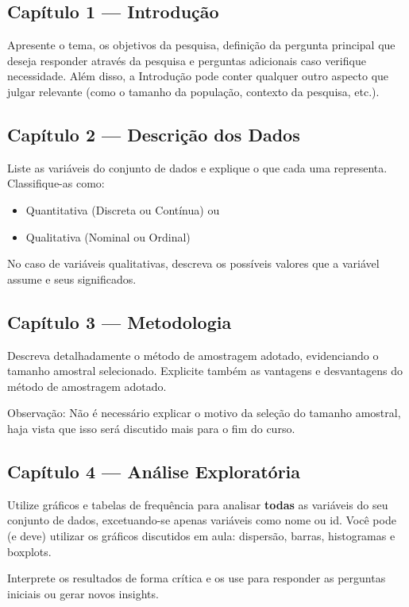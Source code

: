 \documentclass[12pt]{article}
\begin{document}
\subsection*{Capítulo 1 — Introdução}
Apresente o tema, os objetivos da pesquisa, definição da pergunta principal que deseja responder através da pesquisa e 
perguntas adicionais caso verifique necessidade. Além disso, a Introdução pode conter qualquer outro aspecto que julgar relevante (como o tamanho da população, contexto da pesquisa, etc.).

\subsection*{Capítulo 2 — Descrição dos Dados}
Liste as variáveis do conjunto de dados e explique o que cada uma representa. Classifique-as como:

\begin{itemize}
    \item Quantitativa (Discreta ou Contínua) ou
    \item Qualitativa (Nominal ou Ordinal)
\end{itemize}

No caso de variáveis qualitativas, descreva os possíveis valores que a variável assume e seus significados.

\subsection*{Capítulo 3 — Metodologia}
Descreva detalhadamente o método de amostragem adotado, evidenciando o tamanho amostral selecionado. Explicite também as vantagens e desvantagens do método de amostragem adotado. 

Observação: Não é necessário explicar o motivo da seleção do tamanho amostral, haja vista que isso será discutido mais para o fim do curso. 

\subsection*{Capítulo 4 — Análise Exploratória}
Utilize gráficos e tabelas de frequência para analisar \textbf{todas} as variáveis do seu conjunto de dados, excetuando-se apenas variáveis como nome ou id.
Você pode (e deve) utilizar os gráficos discutidos em aula: dispersão, barras, histogramas e boxplots.

Interprete os resultados de forma crítica e os use para responder as perguntas iniciais ou gerar novos insights.
\end{document}
